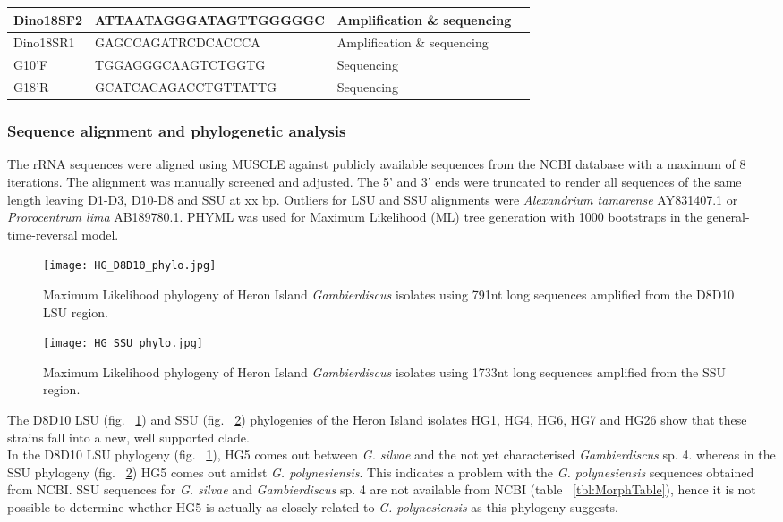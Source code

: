 \documentclass[12pt]{article}
\begin{document}
\begin{table}
\begin{tabular}{  | p{2cm} | p{7.5cm} | p{2.5cm} | p{2cm} | }
 \hline
 Dino18SF2  & ATTAATAGGGATAGTTGGGGGC & Amplification \& sequencing &  \cite{zhang2008mitochondrial}\\
 \hline
 Dino18SR1    & GAGCCAGATRCDCACCCA & Amplification \& sequencing &  \cite{zhang2008mitochondrial}\\ 
 \hline
G10'F    & TGGAGGGCAAGTCTGGTG & Sequencing & \cite{nishimura2013genetic} \\
\hline
G18'R    & GCATCACAGACCTGTTATTG & Sequencing &  \cite{litaker2005reclassification} \\
 \hline
\end{tabular}
\end{table}
\FloatBarrier

\subsubsection{Sequence alignment and phylogenetic analysis}
The rRNA sequences were aligned using MUSCLE against publicly available sequences from the NCBI database with a maximum of 8 iterations. The alignment was manually screened and adjusted. The 5' and 3' ends were truncated to render all sequences of the same length leaving D1-D3, D10-D8 and SSU at xx bp. Outliers for LSU and SSU alignments were \emph{Alexandrium tamarense} AY831407.1 or \emph{Prorocentrum lima} AB189780.1.
PHYML was used for Maximum Likelihood (ML) tree generation with 1000 bootstraps in the general-time-reversal model. \\



\begin{figure} 
\texttt{[image: HG\_D8D10\_phylo.jpg]} 
\caption{Maximum Likelihood phylogeny of Heron Island \textit{Gambierdiscus} isolates using 791nt long sequences amplified from the D8D10 LSU region.} 
\label{fig:HGD8D10}
\end{figure} 
\FloatBarrier 
\newpage

\begin{figure} 
\texttt{[image: HG\_SSU\_phylo.jpg]} 
\caption{Maximum Likelihood phylogeny of Heron Island \textit{Gambierdiscus} isolates using 1733nt long sequences amplified from the SSU region.}
\label{fig:HGSSU} 
\end{figure} 
\FloatBarrier 
\newpage

The D8D10 LSU (fig. ~\ref{fig:HGD8D10}) and SSU (fig. ~\ref{fig:HGSSU}) phylogenies of the Heron Island isolates HG1, HG4, HG6, HG7 and HG26 show that these strains fall into a new, well supported clade.\\
In the D8D10 LSU phylogeny (fig. ~\ref{fig:HGD8D10}), HG5 comes out between \emph{G. silvae} and the not yet characterised \emph{Gambierdiscus} sp. 4. whereas in the SSU phylogeny (fig. ~\ref{fig:HGSSU}) HG5 comes out amidst \emph{G. polynesiensis}. This indicates a problem with the \emph{G. polynesiensis} sequences obtained from NCBI. SSU sequences for \emph{G. silvae} and \emph{Gambierdiscus} sp. 4 are not available from NCBI (table ~\ref{tbl:MorphTable}), hence it is not possible to determine whether HG5 is actually as closely related to \emph{G. polynesiensis} as this phylogeny suggests.\\
\end{document}
